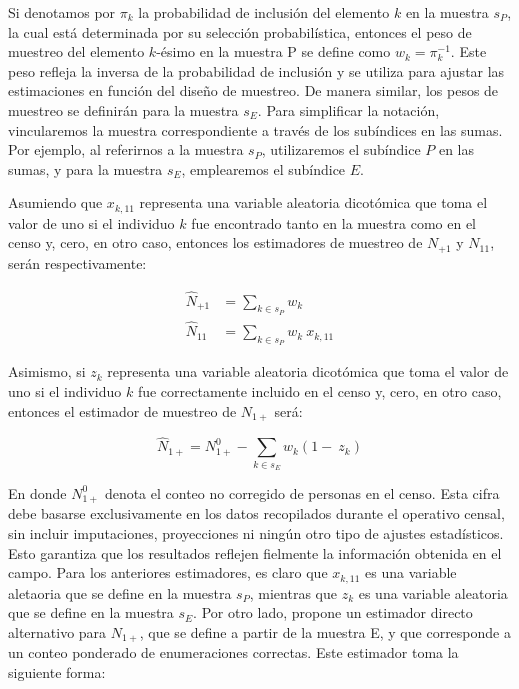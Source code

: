 \documentclass[
  12pt,
]{book}
\begin{document}
Si denotamos por \(\pi_k\) la probabilidad de inclusión del elemento \(k\) en la muestra \(s_P\), la cual está determinada por su selección probabilística, entonces el peso de muestreo del elemento \(k\)-ésimo en la muestra P se define como \(w_k = \pi_k^{-1}\). Este peso refleja la inversa de la probabilidad de inclusión y se utiliza para ajustar las estimaciones en función del diseño de muestreo. De manera similar, los pesos de muestreo se definirán para la muestra \(s_E\). Para simplificar la notación, vincularemos la muestra correspondiente a través de los subíndices en las sumas. Por ejemplo, al referirnos a la muestra \(s_P\), utilizaremos el subíndice \(P\) en las sumas, y para la muestra \(s_E\), emplearemos el subíndice \(E\).

Asumiendo que \(x_{k, 11}\) representa una variable aleatoria dicotómica que toma el valor de uno si el individuo \(k\) fue encontrado tanto en la muestra como en el censo y, cero, en otro caso, entonces los estimadores de muestreo de \({N}_{+1}\) y \({N}_{11}\), serán respectivamente:

\[
\begin{aligned}
\hat{N}_{+1} &= \sum_{k \in s_P} w_k \\
\hat{N}_{11} &= \sum_{k \in s_P} w_k \ x_{k, 11}
\end{aligned}
\]

Asimismo, si \(z_{k}\) representa una variable aleatoria dicotómica que toma el valor de uno si el individuo \(k\) fue correctamente incluido en el censo y, cero, en otro caso, entonces el estimador de muestreo de \({N}_{1+}\) será:

\[
\hat{N}_{1+} = {N}_{1+}^0 - \sum_{k \in s_E} w_k (1 - \ z_{k})
\]

En donde \({N}_{1+}^0\) denota el conteo no corregido de personas en el censo. Esta cifra debe basarse exclusivamente en los datos recopilados durante el operativo censal, sin incluir imputaciones, proyecciones ni ningún otro tipo de ajustes estadísticos. Esto garantiza que los resultados reflejen fielmente la información obtenida en el campo. Para los anteriores estimadores, es claro que \(x_{k, 11}\) es una variable aletaoria que se define en la muestra \(s_P\), mientras que \(z_{k}\) es una variable aleatoria que se define en la muestra \(s_E\). Por otro lado, \citet{USCensusBureau_2022} propone un estimador directo alternativo para \({N}_{1+}\), que se define a partir de la muestra E, y que corresponde a un conteo ponderado de enumeraciones correctas. Este estimador toma la siguiente forma:
\end{document}
